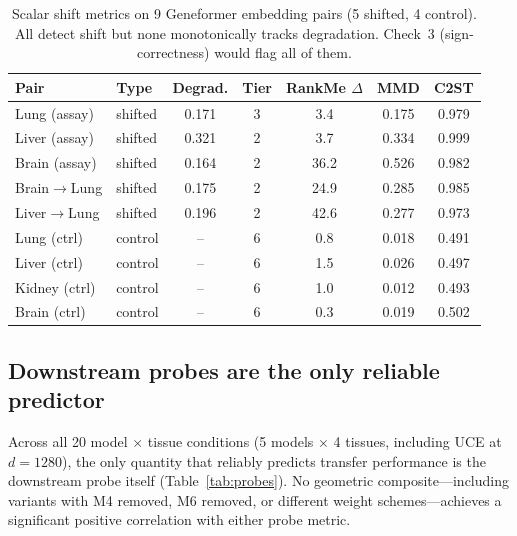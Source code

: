 \documentclass[9pt,lineno]{elife}
\begin{document}
\begin{table}[t]
\centering
\caption{Scalar shift metrics on 9 Geneformer embedding pairs (5 shifted, 4 control). All detect shift but none monotonically tracks degradation. Check~3 (sign-correctness) would flag all of them.}
\label{tab:scalar}
\small
\begin{tabular}{@{}llccccc@{}}
\toprule
Pair & Type & Degrad. & Tier & RankMe $\Delta$ & MMD & C2ST \\
\midrule
Lung (assay)  & shifted & 0.171 & 3 & 3.4  & 0.175 & 0.979 \\
Liver (assay) & shifted & 0.321 & 2 & 3.7  & 0.334 & 0.999 \\
Brain (assay) & shifted & 0.164 & 2 & 36.2 & 0.526 & 0.982 \\
Brain$\to$Lung  & shifted & 0.175 & 2 & 24.9 & 0.285 & 0.985 \\
Liver$\to$Lung  & shifted & 0.196 & 2 & 42.6 & 0.277 & 0.973 \\
\midrule
Lung (ctrl)   & control & -- & 6 & 0.8 & 0.018 & 0.491 \\
Liver (ctrl)  & control & -- & 6 & 1.5 & 0.026 & 0.497 \\
Kidney (ctrl) & control & -- & 6 & 1.0 & 0.012 & 0.493 \\
Brain (ctrl)  & control & -- & 6 & 0.3 & 0.019 & 0.502 \\
\bottomrule
\end{tabular}
\end{table}

\subsection{Downstream probes are the only reliable predictor}

Across all 20 model $\times$ tissue conditions (5 models $\times$ 4 tissues, including UCE at $d = 1280$), the only quantity that reliably predicts transfer performance is the downstream probe itself (Table~\ref{tab:probes}). No geometric composite---including variants with M4 removed, M6 removed, or different weight schemes---achieves a significant positive correlation with either probe metric.
\end{document}
